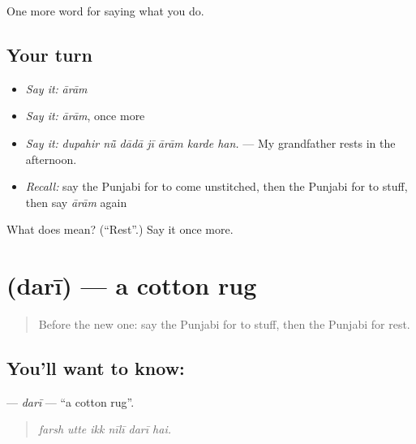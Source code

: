 \begin{grammarlens}[title={What you've built}]
One more word for saying what you do.
\end{grammarlens}

\subsection*{Your turn}
\begin{itemize}
\raggedright
  \item \emph{Say it:} \emph{ārām}
  \item \emph{Say it:} \emph{ārām}, once more
  \item \emph{Say it:} \emph{dupahir nū̃ dādā jī ārām karde han.} — My grandfather rests in the afternoon.
  \item \emph{Recall:} say the Punjabi for to come unstitched, then the Punjabi for to stuff, then say \emph{ārām} again
\end{itemize}

\begin{tcolorbox}[breakable,colback=teal!4,colframe=teal!35!black,title={Before you move on}]
What does  mean? (\textquotedblleft{}Rest\textquotedblright{}.) Say it once more.
\end{tcolorbox}
\section[\texorpdfstring{\pa{ਦਰੀ} (darī)}{ਦਰੀ (darī)}]{ (darī) — a cotton rug}

\label{lesson:PA-C233-dari}



\begin{quote}
Before the new one: say the Punjabi for to stuff, then the Punjabi for rest.
\end{quote}

\subsection*{You'll want to know: }
\textbf{} — \emph{darī} — \textquotedblleft{}a cotton rug\textquotedblright{}.

\begin{quote}
     
\end{quote}

\begin{quote}
\emph{farsh utte ikk nīlī darī hai.}
\end{quote}

